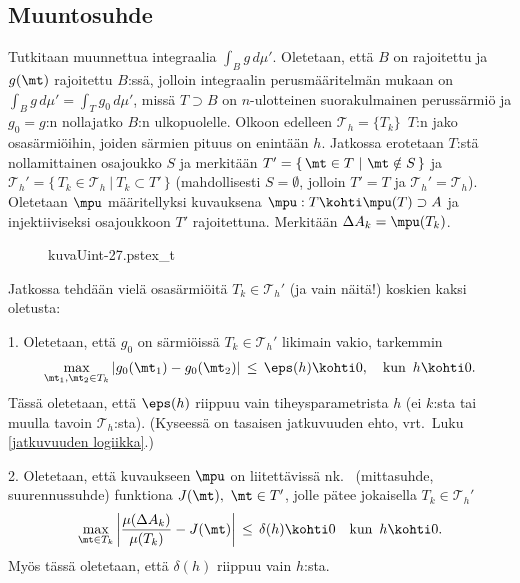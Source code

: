 \subsection*{Muuntosuhde}

Tutkitaan muunnettua integraalia $\int_B g\,d\mu'$. Oletetaan, että $B$ on rajoitettu ja
$g(\mt)$ rajoitettu $B$:ssä, jolloin integraalin perusmääritelmän mukaan on
$\int_B g\,d\mu'=\int_T g_0\,d\mu'$, missä $T \supset B$ on $n$-ulotteinen suorakulmainen
perussärmiö ja $g_0=g$:n nollajatko $B$:n ulkopuolelle. Olkoon edelleen 
$\mathcal{T}_h=\{T_k\}\,$ $T$:n jako osasärmiöihin, joiden särmien pituus on enintään $h$.
Jatkossa erotetaan $T$:stä nollamittainen osajoukko $S$ ja merkitään
$T'=\{\,\mt \in T\ |\ \mt \notin S\,\}$ ja
$\mathcal{T}_h'= \{\,T_k\in\mathcal{T}_h\ |\ T_k \subset T'\,\}$ (mahdollisesti $S=\emptyset$,
jolloin $T'=T$ ja $\mathcal{T}_h'=\mathcal{T}_h$). Oletetaan $\mpu$ määritellyksi
kuvauksena $\mpu: T \kohti \mpu(T) \supset A$ ja injektiiviseksi osajoukkoon $T'$ rajoitettuna.
Merkitään $\Delta A_k=\mpu(T_k)$.
\begin{figure}[H]
\begin{center}
{kuvaUint-27.pstex_t}
\end{center}
\end{figure}
Jatkossa tehdään vielä osasärmiöitä $T_k\in\mathcal{T}_h'$ (ja vain näitä!) koskien kaksi
oletusta: 

1. Oletetaan, että $g_0$ on särmiöissä $T_k\in\mathcal{T}_h'$ likimain vakio, tarkemmin
\[
\max_{\mt_1,\mt_2 \in T_k}|g_0(\mt_1)-g_0(\mt_2)| \,\le\, \eps(h) \kohti 0, \quad 
                                                        \text{kun}\,\ h \kohti 0. 
\]
Tässä oletetaan, että $\eps(h)$ riippuu vain tiheysparametrista $h$ (ei $k$:sta tai muulla
tavoin $\mathcal{T}_h$:sta). (Kyseessä on tasaisen jatkuvuuden ehto, vrt.\
Luku \ref{jatkuvuuden logiikka}.)

2. Oletetaan, että kuvaukseen $\mpu$ on liitettävissä
%
nk.\  (mittasuhde, suurennussuhde) funktiona $J(\mt),\ \mt \in T'$, jolle
pätee jokaisella $T_k\in\mathcal{T}_h'$
\[
\max_{\mt \in T_k}\left|\frac{\mu(\Delta A_k)}{\mu(T_k)}-J(\mt)\right| 
   \,\le\,\delta(h) \kohti 0 \quad \text{kun}\,\ h \kohti 0.
\]
Myös tässä oletetaan, että $\delta(h)$ riippuu vain $h$:sta.

